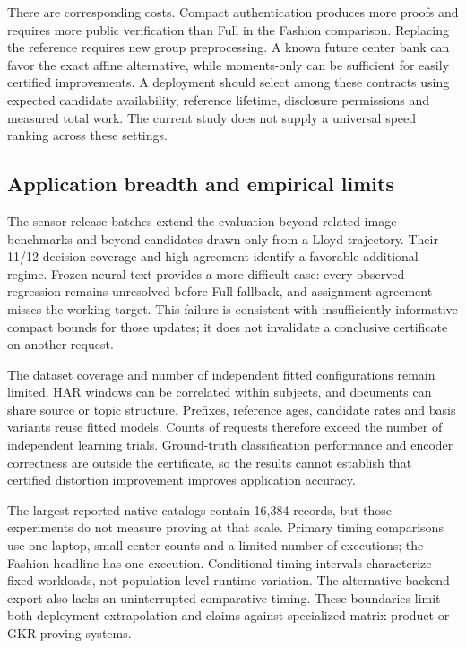 There are corresponding costs. Compact authentication produces more proofs
and requires more public verification than Full in the Fashion comparison.
Replacing the reference requires new group preprocessing. A known future
center bank can favor the exact affine alternative, while moments-only can
be sufficient for easily certified improvements. A deployment should select
among these contracts using expected candidate availability, reference
lifetime, disclosure permissions and measured total work. The current study
does not supply a universal speed ranking across these settings.

\subsection{Application breadth and empirical limits}
The sensor release batches extend the evaluation beyond related image
benchmarks and beyond candidates drawn only from a Lloyd trajectory. Their
11/12 decision coverage and high agreement identify a favorable additional
regime. Frozen neural text provides a more difficult case: every observed
regression remains unresolved before Full fallback, and assignment agreement
misses the working target. This failure is consistent with insufficiently
informative compact bounds for those updates; it does not invalidate a
conclusive certificate on another request.

The dataset coverage and number of independent fitted configurations remain
limited. HAR windows can be correlated within subjects, and documents can
share source or topic structure. Prefixes, reference ages, candidate rates
and basis variants reuse fitted models. Counts of requests therefore exceed
the number of independent learning trials. Ground-truth classification
performance and encoder correctness are outside the certificate, so the
results cannot establish that certified distortion improvement improves
application accuracy.

The largest reported native catalogs contain 16,384 records, but those
experiments do not measure proving at that scale. Primary timing comparisons
use one laptop, small center counts and a limited number of executions;
the Fashion headline has one execution. Conditional timing intervals
characterize fixed workloads, not population-level runtime variation.
The alternative-backend export also lacks an uninterrupted comparative
timing. These boundaries limit both deployment extrapolation and claims
against specialized matrix-product or GKR proving systems.

